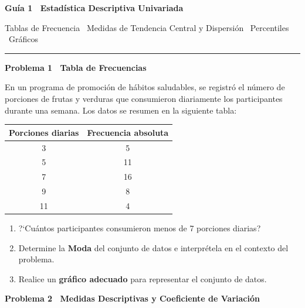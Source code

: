 \documentclass[10pt,letterpaper]{article}
\newcommand{\seccion}[1]{%
  \vspace{2pt}%
  \begin{tcolorbox}[enhanced,colback=white,colframe=black,arc=0pt,boxrule=0pt,
    leftrule=2pt,left=6pt,right=6pt,top=1pt,bottom=1pt]
    {\normalsize\bfseries\sffamily #1}
  \end{tcolorbox}%
  \vspace{1pt}%
}
\begin{document}
\thispagestyle{empty}

\begin{center}
  {\fontsize{15}{17}\selectfont\bfseries\sffamily Gu\'ia 1 \textendash\ Estad\'istica Descriptiva Univariada\par}
  \vspace{0.05cm}
  {\small\sffamily Tablas de Frecuencia \textperiodcentered\ Medidas de Tendencia Central y Dispersi\'on \textperiodcentered\ Percentiles \textperiodcentered\ Gr\'aficos\par}
  {\rule{3cm}{0.6pt}}
\end{center}

\vspace{0.15cm}

\seccion{Problema 1 \textendash\ Tabla de Frecuencias}

\noindent\sffamily\small En un programa de promoci\'on de h\'abitos saludables, se registr\'o el n\'umero de porciones de frutas y verduras que consumieron diariamente los participantes durante una semana. Los datos se resumen en la siguiente tabla:

\vspace{4pt}
\begin{center}
\small\sffamily
\begin{tabular}{|c|c|}
\hline
\textbf{Porciones diarias} & \textbf{Frecuencia absoluta} \\
\hline
3  & 5  \\
\hline
5  & 11 \\
\hline
7  & 16 \\
\hline
9  & 8  \\
\hline
11 & 4  \\
\hline
\end{tabular}
\end{center}
\vspace{4pt}

\begin{enumerate}[leftmargin=1.2cm, label=\textbf{\alph*)}, itemsep=2pt, topsep=2pt]
  \item ?`Cu\'antos participantes consumieron menos de 7 porciones diarias?
  \item Determine la \textbf{Moda} del conjunto de datos e interpr\'etela en el contexto del problema.
  \item Realice un \textbf{gr\'afico adecuado} para representar el conjunto de datos.
\end{enumerate}

\seccion{Problema 2 \textendash\ Medidas Descriptivas y Coeficiente de Variaci\'on}
\end{document}
